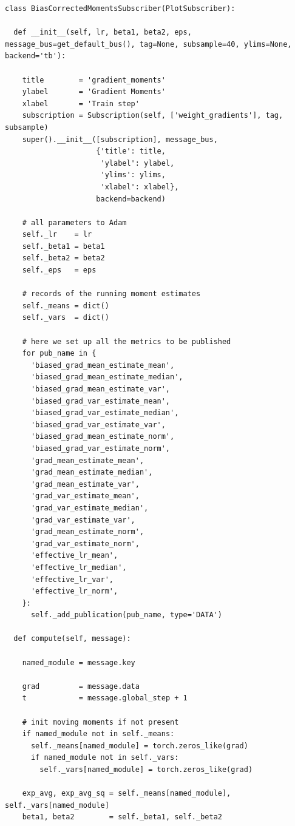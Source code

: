 \begin{lstlisting}[label={lst:running_moments_sub},
caption={Subscriber to record Adam terms}]
class BiasCorrectedMomentsSubscriber(PlotSubscriber):

  def __init__(self, lr, beta1, beta2, eps, message_bus=get_default_bus(), tag=None, subsample=40, ylims=None, backend='tb'):

    title        = 'gradient_moments'
    ylabel       = 'Gradient Moments'
    xlabel       = 'Train step'
    subscription = Subscription(self, ['weight_gradients'], tag, subsample)
    super().__init__([subscription], message_bus,
                     {'title': title,
                      'ylabel': ylabel,
                      'ylims': ylims,
                      'xlabel': xlabel},
                     backend=backend)

    # all parameters to Adam
    self._lr    = lr
    self._beta1 = beta1
    self._beta2 = beta2
    self._eps   = eps

    # records of the running moment estimates
    self._means = dict()
    self._vars  = dict()

    # here we set up all the metrics to be published
    for pub_name in {
      'biased_grad_mean_estimate_mean',
      'biased_grad_mean_estimate_median',
      'biased_grad_mean_estimate_var',
      'biased_grad_var_estimate_mean',
      'biased_grad_var_estimate_median',
      'biased_grad_var_estimate_var',
      'biased_grad_mean_estimate_norm',
      'biased_grad_var_estimate_norm',
      'grad_mean_estimate_mean',
      'grad_mean_estimate_median',
      'grad_mean_estimate_var',
      'grad_var_estimate_mean',
      'grad_var_estimate_median',
      'grad_var_estimate_var',
      'grad_mean_estimate_norm',
      'grad_var_estimate_norm',
      'effective_lr_mean',
      'effective_lr_median',
      'effective_lr_var',
      'effective_lr_norm',
    }:
      self._add_publication(pub_name, type='DATA')

  def compute(self, message):

    named_module = message.key

    grad         = message.data
    t            = message.global_step + 1

    # init moving moments if not present
    if named_module not in self._means:
      self._means[named_module] = torch.zeros_like(grad)
      if named_module not in self._vars:
        self._vars[named_module] = torch.zeros_like(grad)

    exp_avg, exp_avg_sq = self._means[named_module], self._vars[named_module]
    beta1, beta2        = self._beta1, self._beta2


\end{lstlisting}
